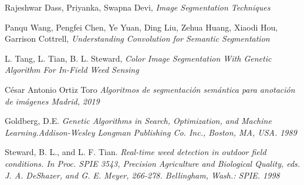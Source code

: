 \documentclass[conference,compsoc]{IEEEtran}
\begin{document}
%
%
%
\begin{thebibliography}{1}
Rajeshwar Dass, Priyanka, Swapna Devi, \emph{Image Segmentation Techniques}

Panqu Wang, Pengfei Chen, Ye Yuan, Ding Liu, Zehua Huang, Xiaodi Hou, Garrison Cottrell, \emph{Understanding Convolution for Semantic Segmentation}

L. Tang, L. Tian, B. L. Steward, \emph{Color Image Segmentation With Genetic Algorithm For In-Field Weed Sensing}

César Antonio Ortiz Toro \emph{Algoritmos de segmentación semántica para anotación de imágenes \relax Madrid, 2019}


Goldberg, D.E. \emph{Genetic Algorithms in Search, Optimization, and Machine Learning.\relax Addison-Wesley Longman Publishing Co. Inc., Boston, MA, USA. 1989}

Steward, B. L., and L. F. Tian. \emph{Real-time weed detection in outdoor field conditions. In Proc. SPIE 3543, Precision Agriculture and Biological Quality, eds. J. A. DeShazer, and G. E. Meyer, 266-278. Bellingham, Wash.: SPIE. 1998}

\end{thebibliography}

\end{document}
